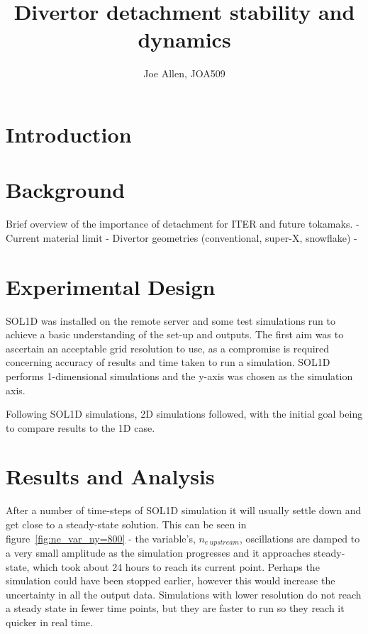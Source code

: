 \documentclass[11pt, twocolumn]{article}  %
\providecommand{\neupstream}{$n_{e~upstream}$} %
\begin{document}
\title{Divertor detachment stability and dynamics}
\author{Joe Allen, JOA509}



\section{Introduction}\label{sec:Intro}

\section{Background}\label{sec:Bg}
Brief overview of the importance of detachment for ITER and future tokamaks.
- Current material limit
- Divertor geometries (conventional, super-X, snowflake)
- 


\section{Experimental Design}\label{sec:Expt}
SOL1D was installed on the remote server and some test simulations run to achieve a basic understanding of the set-up and outputs. The first aim was to ascertain an acceptable grid resolution to use, as a compromise is required concerning accuracy of results and time taken to run a simulation. SOL1D performs 1-dimensional simulations and the y-axis was chosen as the simulation axis. 




Following SOL1D simulations, 2D simulations followed, with the initial goal being to compare results to the 1D case.


\section{Results and Analysis}\label{sec:Results}
After a number of time-steps of SOL1D simulation it will usually settle down and get close to a steady-state solution. This can be seen in figure~\ref{fig:ne_var_ny=800} - the variable's, \neupstream, oscillations are damped to a very small amplitude as the simulation progresses and it approaches steady-state, which took about 24 hours to reach its current point. Perhaps the simulation could have been stopped earlier, however this would increase the uncertainty in all the output data. Simulations with lower resolution do not reach a steady state in fewer time points, but they are faster to run so they reach it quicker in real time.
\end{document}
